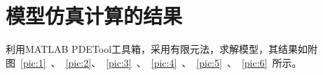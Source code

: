 \documentclass[a4paper,cs4size,adobefonts,fancyhdr]{ctexart}[2005/11/25]
\numberwithin{equation}{section} %
\begin{document}
\section{模型仿真计算的结果}
利用MATLAB PDETool工具箱，采用有限元法，求解模型，其结果如附图~\ref{pic:1}~、~\ref{pic:2}、~\ref{pic:3}~、~\ref{pic:4}~、~\ref{pic:5}~、~\ref{pic:6}~所示。\par
\end{document}
